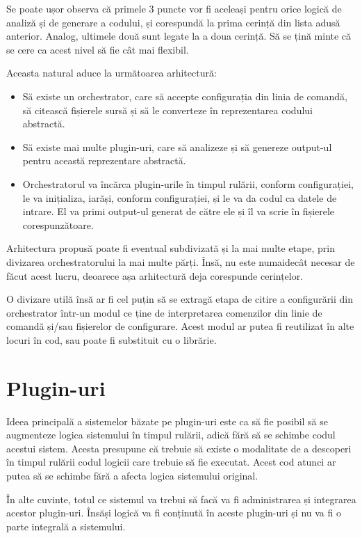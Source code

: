 \documentclass[a4paper,12pt]{report}
\begin{document}
Se poate ușor observa că primele 3 puncte vor fi aceleași pentru orice logică de analiză și de generare a codului, și corespundă la prima cerință din lista adusă anterior.
Analog, ultimele două sunt legate la a doua cerință.
Să se țină minte că se cere ca acest nivel să fie cât mai flexibil.

Aceasta natural aduce la următoarea arhitectură:

\begin{itemize}
  \item Să existe un orchestrator, care să accepte configurația din linia de comandă, să citească fișierele sursă și să le converteze în reprezentarea codului abstractă.
  \item Să existe mai multe plugin-uri, care să analizeze și să genereze output-ul pentru această reprezentare abstractă.
  \item Orchestratorul va încărca plugin-urile în timpul rulării, conform configurației, le va inițializa, iarăși, conform configurației, și le va da codul ca datele de intrare. El va primi output-ul generat de către ele și îl va scrie în fișierele corespunzătoare.
\end{itemize}

Arhitectura propusă poate fi eventual subdivizată și la mai multe etape, prin divizarea orchestratorului la mai multe părți.
Însă, nu este numaidecât necesar de făcut acest lucru, deoarece așa arhitectură deja corespunde cerințelor.

O divizare utilă însă ar fi cel puțin să se extragă etapa de citire a configurării din orchestrator într-un modul ce ține de interpretarea comenzilor din linie de comandă și/sau fișierelor de configurare.
Acest modul ar putea fi reutilizat în alte locuri în cod, sau poate fi substituit cu o librărie.

\section{Plugin-uri}

Ideea principală a sistemelor băzate pe plugin-uri este ca să fie posibil să se augmenteze logica sistemului în timpul rulării, adică fără să se schimbe codul acestui sistem.
Acesta presupune că trebuie să existe o modalitate de a descoperi în timpul rulării codul logicii care trebuie să fie executat.
Acest cod atunci ar putea să se schimbe fără a afecta logica sistemului original.

În alte cuvinte, totul ce sistemul va trebui să facă va fi administrarea și integrarea acestor plugin-uri.
Însăși logică va fi conținută în aceste plugin-uri și nu va fi o parte integrală a sistemului.
\end{document}
